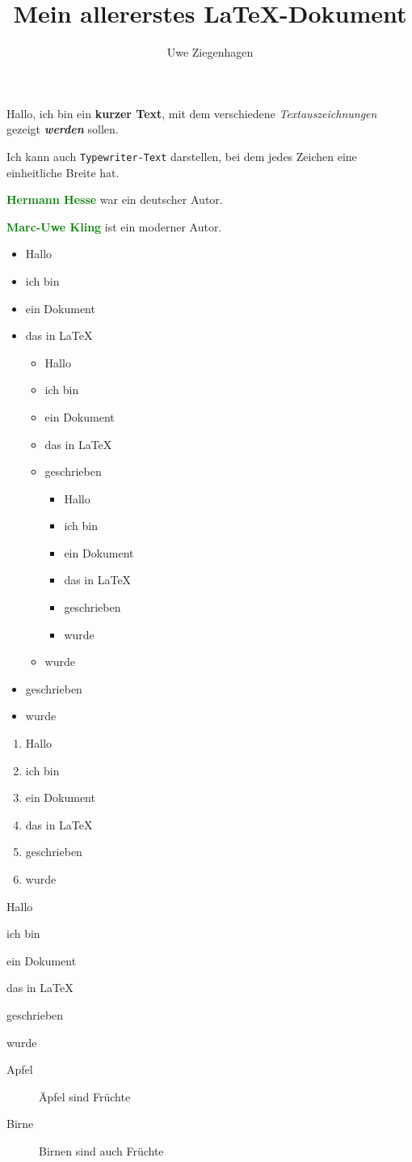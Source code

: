 \documentclass[ngerman,12pt,parskip=half]{scrartcl}
\author{Uwe Ziegenhagen}
\title{Mein allererstes \LaTeX-Dokument}
\newcommand{\autor}[1]{\textbf{\textcolor{green}{#1}}}
\begin{document}
Hallo, ich bin ein \textbf{kurzer Text}, mit dem verschiedene \textit{Textauszeichnungen} gezeigt \textbf{\textit{werden }} sollen. 

Ich kann auch \texttt{Typewriter-Text} darstellen, bei dem jedes Zeichen eine einheitliche Breite hat.

\autor{Hermann Hesse} war ein deutscher Autor.

\autor{Marc-Uwe Kling} ist ein moderner Autor.

\begin{itemize}
	\item Hallo
	\item ich bin 
	\item ein Dokument
	\item das in \LaTeX 
	
	\begin{itemize}
		\item Hallo
		\item ich bin 
		\item ein Dokument
		\item das in \LaTeX
		\item geschrieben
		
		\begin{itemize}
			\item Hallo
			\item ich bin 
			\item ein Dokument
			\item das in \LaTeX
			\item geschrieben
			\item wurde
		\end{itemize}
		
		\item wurde
	\end{itemize}
	
	
	\item geschrieben
	\item wurde
\end{itemize}

\begin{enumerate}
	\item Hallo
	\item ich bin 
	\item ein Dokument
	\item das in \LaTeX
	\item geschrieben
	\item wurde
\end{enumerate}

\begin{compactenum}[i]
	\item Hallo
	\item ich bin 
	\item ein Dokument
	\item das in \LaTeX
	\item geschrieben
	\item wurde
\end{compactenum}


\begin{description}
	\item[Apfel] Äpfel sind Früchte
	\item[Birne] Birnen sind auch Früchte
\end{description}
\end{document}
